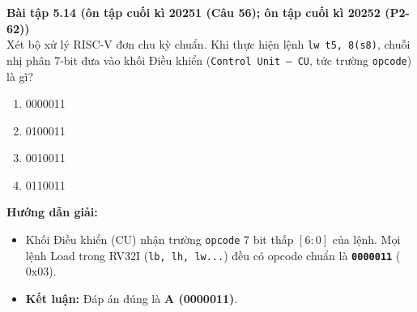 \textbf{Bài tập 5.14 (ôn tập cuối kì 20251 (Câu 56); ôn tập cuối kì 20252 (P2-62))}\\
Xét bộ xử lý RISC-V đơn chu kỳ chuẩn. Khi thực hiện lệnh \texttt{lw t5, 8(s8)}, chuỗi nhị phân 7-bit đưa vào khối Điều khiển (\texttt{Control Unit --- CU}, tức trường \texttt{opcode}) là gì?
\begin{enumerate}[label=\Alph*.]
    \item 0000011
    \item 0100011
    \item 0010011
    \item 0110011
\end{enumerate}
\textbf{Hướng dẫn giải:}
\begin{itemize}
    \item Khối Điều khiển (CU) nhận trường \texttt{opcode} $7$ bit thấp $[6:0]$ của lệnh. Mọi lệnh Load trong RV32I (\texttt{lb, lh, lw...}) đều có opcode chuẩn là \textbf{\texttt{0000011}} ($\text{0x03}$).
    \item \textbf{Kết luận:} Đáp án đúng là \textbf{A (0000011)}.
\end{itemize}

